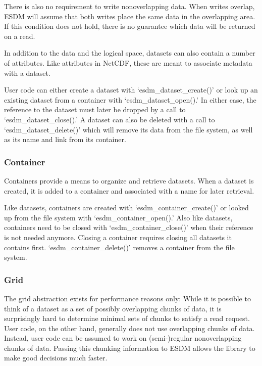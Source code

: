 There is also no requirement to write nonoverlapping data. When writes
overlap, ESDM will assume that both writes place the same data in the
overlapping area. If this condition does not hold, there is no guarantee
which data will be returned on a read.

In addition to the data and the logical space, datasets can also contain
a number of attributes. Like attributes in NetCDF, these are meant to
associate metadata with a dataset.

User code can either create a dataset with `esdm\_dataset\_create()' or
look up an existing dataset from a container with
`esdm\_dataset\_open().' In either case, the reference to the dataset
must later be dropped by a call to `esdm\_dataset\_close().' A dataset
can also be deleted with a call to `esdm\_dataset\_delete()' which will
remove its data from the file system, as well as its name and link from
its container.

\subsubsection{Container}%
\label{sec:user-guides:container}

Containers provide a means to organize and retrieve datasets. When a
dataset is created, it is added to a container and associated with a
name for later retrieval.

Like datasets, containers are created with `esdm\_container\_create()'
or looked up from the file system with `esdm\_container\_open().' Also
like datasets, containers need to be closed with
`esdm\_container\_close()' when their reference is not needed anymore.
Closing a container requires closing all datasets it contains first.
`esdm\_container\_delete()' removes a container from the file system.

\subsubsection{Grid}%
\label{sec:user-guides:grid}


The grid abstraction exists for performance reasons only: While it is
possible to think of a dataset as a set of possibly overlapping chunks
of data, it is surprisingly hard to determine minimal sets of chunks to
satisfy a read request. User code, on the other hand, generally does not
use overlapping chunks of data. Instead, user code can be assumed to
work on (semi-)regular nonoverlapping chunks of data. Passing this
chunking information to ESDM allows the library to make good decisions
much faster.

